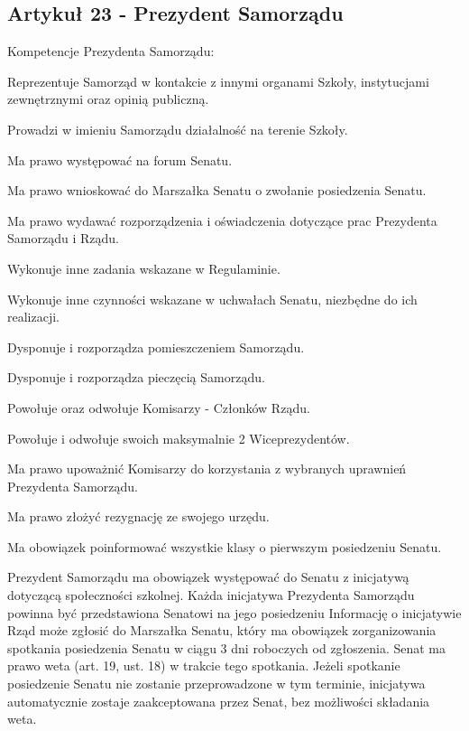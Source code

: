 \documentclass[14pt]{article}
\newcounter{podpunktyCounter}
\newenvironment{podpunkty}
{%
	\begin{list}{\arabic{podpunktyCounter})}%
		{%
			\usecounter{podpunktyCounter}
			\setlength{\itemsep}{1pt}
			\setlength{\topsep}{3pt}
		}%
	}%
	{\end{list}}
\newenvironment{ustepy}{%
	\begin{enumerate}[leftmargin=1.5em, itemindent=1pt, labelwidth=1em, itemsep=5pt]
	}{%
	\end{enumerate}
}
\begin{document}
\subsection*{Artykuł 23 - Prezydent Samorządu}
\begin{ustepy}
	
	\item Kompetencje Prezydenta Samorządu:
	\begin{podpunkty}
		\item Reprezentuje Samorząd w kontakcie z innymi organami Szkoły, instytucjami zewnętrznymi oraz opinią publiczną.
		\item Prowadzi w imieniu Samorządu działalność na terenie Szkoły.
		\item Ma prawo występować na forum Senatu.
		\item Ma prawo wnioskować do Marszałka Senatu o zwołanie posiedzenia Senatu.
		\item Ma prawo wydawać rozporządzenia i oświadczenia dotyczące prac Prezydenta Samorządu i Rządu.
		\item Wykonuje inne zadania wskazane w Regulaminie.
		\item Wykonuje inne czynności wskazane w uchwałach Senatu, niezbędne do ich realizacji.
		\item Dysponuje i rozporządza pomieszczeniem Samorządu.
		\item Dysponuje i rozporządza pieczęcią Samorządu.
		\item Powołuje oraz odwołuje Komisarzy - Członków Rządu.
		\item Powołuje i odwołuje swoich maksymalnie 2 Wiceprezydentów.
		\item Ma prawo upoważnić Komisarzy do korzystania z wybranych uprawnień Prezydenta Samorządu.
		\item Ma prawo złożyć rezygnację ze swojego urzędu.
		\item Ma obowiązek poinformować wszystkie klasy o pierwszym posiedzeniu Senatu.
	\end{podpunkty}
	
	\item Prezydent Samorządu ma obowiązek występować do Senatu z inicjatywą dotyczącą społeczności szkolnej. Każda inicjatywa Prezydenta Samorządu powinna być przedstawiona Senatowi na jego posiedzeniu Informację o inicjatywie Rząd może zgłosić do Marszałka Senatu, który ma obowiązek zorganizowania spotkania posiedzenia Senatu w ciągu 3 dni roboczych od zgłoszenia. Senat ma prawo weta (art. 19, ust. 18) w trakcie tego spotkania. Jeżeli spotkanie posiedzenie Senatu nie zostanie przeprowadzone w tym terminie, inicjatywa automatycznie zostaje zaakceptowana przez Senat, bez możliwości składania weta.
\end{ustepy}
\end{document}
